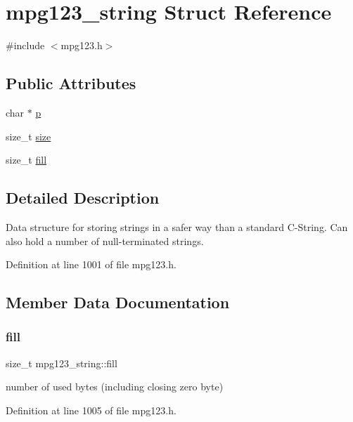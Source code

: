 \hypertarget{structmpg123__string}{}\section{mpg123\+\_\+string Struct Reference}
\label{structmpg123__string}


{\ttfamily \#include $<$mpg123.\+h$>$}

\subsection*{Public Attributes}
\begin{DoxyCompactItemize}
\item 
char $\ast$ \mbox{\hyperlink{structmpg123__string_a25dc48dd64c1df5e56bc2260b74dc5d2}{p}}
\item 
size\+\_\+t \mbox{\hyperlink{structmpg123__string_afa783be283e7e2f287f0b8a129701eba}{size}}
\item 
size\+\_\+t \mbox{\hyperlink{structmpg123__string_ab6a0704da4410a7e913fae5731284915}{fill}}
\end{DoxyCompactItemize}


\subsection{Detailed Description}
Data structure for storing strings in a safer way than a standard C-\/\+String. Can also hold a number of null-\/terminated strings. 

Definition at line 1001 of file mpg123.\+h.



\subsection{Member Data Documentation}
\mbox{\label{structmpg123__string_ab6a0704da4410a7e913fae5731284915}} 
\subsubsection{\texorpdfstring{fill}{fill}}
{\footnotesize\ttfamily size\+\_\+t mpg123\+\_\+string\+::fill}

number of used bytes (including closing zero byte) 

Definition at line 1005 of file mpg123.\+h.

